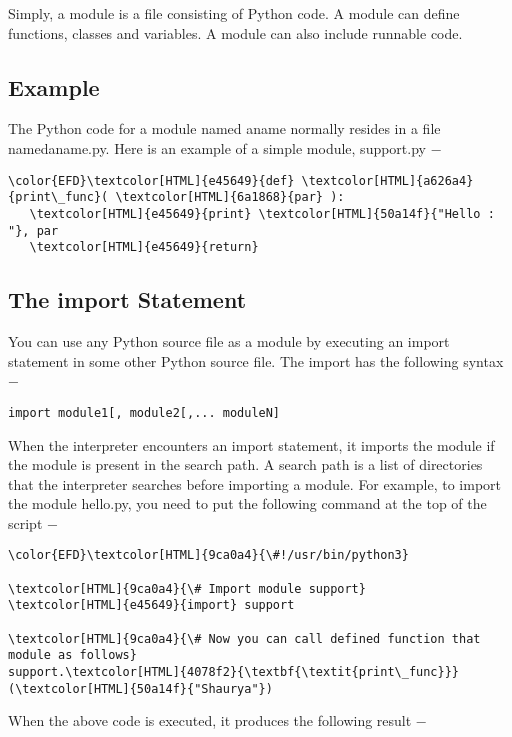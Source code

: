 \documentclass{scrartcl}
\begin{document}
Simply, a module is a file consisting of Python code. A module can define functions, classes and variables. A module can also include runnable code.

\subsection{Example}
\label{sec:orgdd6c46f}
The Python code for a module named aname normally resides in a file namedaname.py. Here is an example of a simple module, support.py −

\begin{Code}
\begin{Verbatim}[]
\color{EFD}\textcolor[HTML]{e45649}{def} \textcolor[HTML]{a626a4}{print\_func}( \textcolor[HTML]{6a1868}{par} ):
   \textcolor[HTML]{e45649}{print} \textcolor[HTML]{50a14f}{"Hello : "}, par
   \textcolor[HTML]{e45649}{return}
\end{Verbatim}
\end{Code}

\subsection{The import Statement}
\label{sec:org83e2fc3}
You can use any Python source file as a module by executing an import statement in some other Python source file. The import has the following syntax −

\texttt{import module1[, module2[,... moduleN]}

When the interpreter encounters an import statement, it imports the module if the module is present in the search path. A search path is a list of directories that the interpreter searches before importing a module. For example, to import the module hello.py, you need to put the following command at the top of the script −

\begin{Code}
\begin{Verbatim}[]
\color{EFD}\textcolor[HTML]{9ca0a4}{\#!/usr/bin/python3}

\textcolor[HTML]{9ca0a4}{\# Import module support}
\textcolor[HTML]{e45649}{import} support

\textcolor[HTML]{9ca0a4}{\# Now you can call defined function that module as follows}
support.\textcolor[HTML]{4078f2}{\textbf{\textit{print\_func}}}(\textcolor[HTML]{50a14f}{"Shaurya"})
\end{Verbatim}
\end{Code}

When the above code is executed, it produces the following result −
\end{document}
